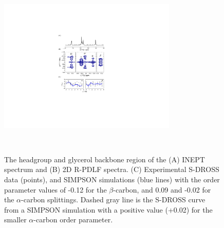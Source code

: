 \documentclass[aps,prl,superscriptaddress,twocolumn]{revtex4}
\begin{document}
\begin{figure}[!tb]
  \centering
  \includegraphics[width=8.5cm]{../Figs/fig1_POPS.pdf}
  \caption{\label{PShgSIGNSsimpson}
    The headgroup and glycerol backbone region of the (A) INEPT spectrum and
    (B) 2D R-PDLF spectra.
    (C) Experimental S-DROSS data (points), and SIMPSON simulations (blue lines) with
    the order parameter values of -0.12 for the $\beta$-carbon, and 0.09 and -0.02
    for the $\alpha$-carbon splittings.
    Dashed gray line is the S-DROSS curve from a SIMPSON simulation with a positive value (+0.02) 
    for the smaller $\alpha$-carbon order parameter.
  }
  \\
\end{figure}
\end{document}
